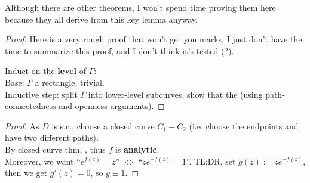 \documentclass[12pt,a4paper]{article}
\begin{document}
\vspace{1.0em}

\noindent Although there are other theorems, I won't spend time proving them here because they all derive from this key lemma anyway. \\


\begin{proof}
  Here is a very rough proof that won't get you marks, I just don't have the time to summarize this proof, and I don't think it's tested (?).

  \noindent Induct on the \textbf{level} of $\Gamma$: \\
  
  \noindent Base: $\Gamma$ a rectangle, trivial. \\
  
  \noindent Inductive step: split $\Gamma$ into lower-level subcurves, show that the   (using path-connectedness and openness arguments).
\end{proof}

\vspace{1.0em}


\begin{proof}
  As $D$ is s.c., choose a closed curve $C_1 - C_2$ (i.e. choose the endpoints and have two different paths). \\

  \noindent By closed curve thm, , thus $f$ is \textbf{analytic}. \\

  \noindent Moreover, we want ``$e^{f(z)} = z$'' $\Leftrightarrow$ ``$ze^{-f(z)} = 1$''. TL;DR, set $g(z) := ze^{-f(z)}$, then we get $g'(z) = 0$, so $g \equiv 1$.
\end{proof}
\end{document}
